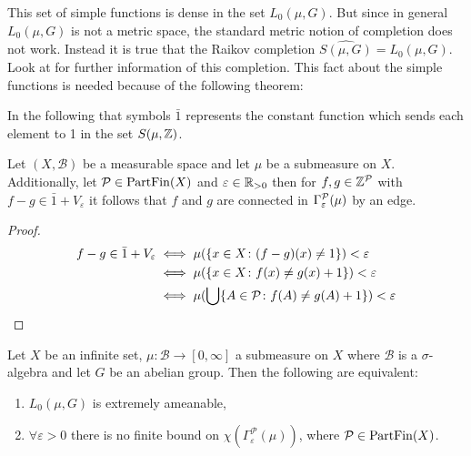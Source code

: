 This set of simple functions is dense in the set $L_0(\mu, G)$. But since in general $L_0(\mu, G)$ is not a metric space, the standard metric notion of completion does not work. Instead it is true that the Raikov completion $\widehat{S(\mu, G)} = L_0(\mu, G)$. Look at \cite{} for further information of this completion. This fact about the simple functions is needed because of the following theorem:
\begin{thm}
  
\end{thm}

In the following that symbols $\bar{1}$ represents the constant function which sends each element to 1 in the set $S(\mu, \Z)$. 

\begin{lemma}\label{lem:1}
  Let $(X, \mathcal{B})$ be a measurable space and let $\mu$ be a submeasure on $X$. Additionally, let $\P \in {\rm PartFin}(X)$ and $\varepsilon \in \R_{>0}$ then for $f,g \in \Z^\P$ with $f - g \in \bar{1} + V_\varepsilon$ it follows that $f$ and $g$ are connected in $\Gamma_\varepsilon^\P(\mu)$ by an edge.
\end{lemma}

\begin{proof}
  \begin{align*}
    f - g \in \bar{1} + V_\varepsilon   &\iff \mu(\{x \in X\colon (f-g)(x) \neq 1\}) < \varepsilon \\
                                      &\iff \mu(\{x \in X\colon f(x) \neq g(x) + 1\}) < \varepsilon \\
                                      &\iff \mu(\bigcup \{A \in \P \colon f(A) \neq g(A) + 1\}) < \varepsilon
  \end{align*}
\end{proof}

\begin{thm}\label{thm:colve}
  Let $X$ be an infinite set, $\mu\colon \mathcal{B} \to [0, \infty]$ a submeasure on $X$ where $\mathcal{B}$ is a $\sigma$-algebra and let $G$ be an abelian group. Then the following are equivalent:
  \begin{enumerate}
    \item $L_0(\mu, G)$ is extremely ameanable,
    \item $\forall \varepsilon > 0$ there is no finite bound on $\chi(\Gamma_{\varepsilon}^{\mathcal{P}}(\mu))$, where $\mathcal{P} \in {\rm PartFin}(X)$.
  \end{enumerate}
\end{thm}

